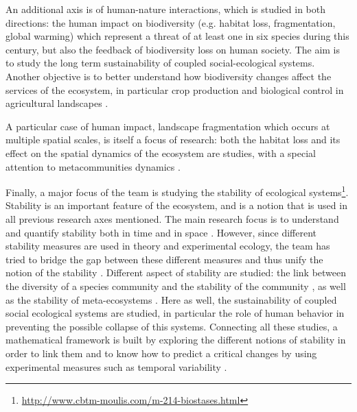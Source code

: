 \documentclass{article}
\begin{document}
An additional axis is of human-nature interactions, which is studied in both directions: the human impact on biodiversity (e.g. habitat loss, fragmentation, global warming) which represent a threat of at least one in six species during this century, but also the feedback of biodiversity loss on human society. The aim is to study the long term sustainability of coupled social-ecological systems. Another objective is to better understand how biodiversity changes affect the services of the ecosystem, in particular crop production and biological control in agricultural landscapes \citep{cazalis_we_2018, lafuite_sustainable_2018, montoya_trade-offs_2018, montoya_tradeoffs_2019}.

A particular case of human impact, landscape fragmentation which occurs at multiple spatial scales, is itself a focus of research: both the habitat loss and its effect on the spatial dynamics of the ecosystem are studies, with a special attention to metacommunities dynamics \citep{goncalves_habitat_2018, jacobi_operationalizing_2018}.

Finally, a major focus of the team is studying the stability of ecological systems\footnote{\url{http://www.cbtm-moulis.com/m-214-biostases.html}}. Stability is an important feature of the ecosystem, and is a notion that is used in all previous research axes mentioned. The main research focus is to understand and quantify stability both in time and in space \citep{wang_stability_2017, zelnik_impact_2018}. However, since different stability measures are used in theory and experimental ecology, the team has tried to bridge the gap between these different measures and thus unify the notion of the stability \citep{arnold_examination_nodate}. Different aspect of stability are studied: the link between the diversity of a species community and the stability of the community \citep{vallina2017phytoplankton}, as well as the stability of meta-ecosystems \citep{arnoldi_particularity_2016, lurgi_effects_2016, wang_biodiversity_2016}.
Here as well, the sustainability of coupled social ecological systems are studied, in particular the role of human behavior in preventing the possible collapse of this systems.
Connecting all these studies, a mathematical framework is built by exploring the different notions of stability in order to link them \citep{arnoldi2016unifying, donohue_navigating_2016} and to know how to predict a critical changes by using experimental measures such as temporal variability \citep{arnoldi2016resilience, haegeman_resilience_2016, wang_invariability-area_2017}. 
\end{document}
